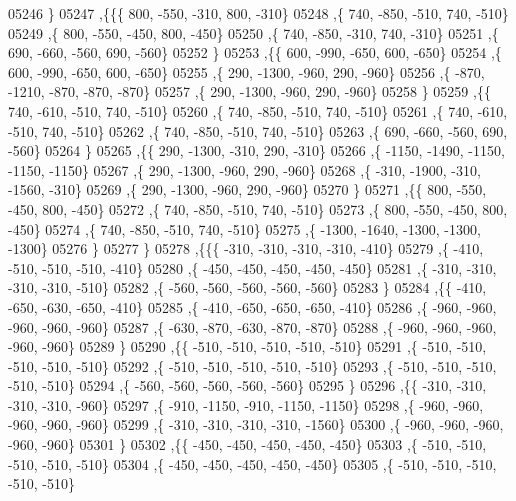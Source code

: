 \begin{DoxyCode}
05246    \}
05247   ,\{\{\{   800,  -550,  -310,   800,  -310\}
05248     ,\{   740,  -850,  -510,   740,  -510\}
05249     ,\{   800,  -550,  -450,   800,  -450\}
05250     ,\{   740,  -850,  -310,   740,  -310\}
05251     ,\{   690,  -660,  -560,   690,  -560\}
05252     \}
05253    ,\{\{   600,  -990,  -650,   600,  -650\}
05254     ,\{   600,  -990,  -650,   600,  -650\}
05255     ,\{   290, -1300,  -960,   290,  -960\}
05256     ,\{  -870, -1210,  -870,  -870,  -870\}
05257     ,\{   290, -1300,  -960,   290,  -960\}
05258     \}
05259    ,\{\{   740,  -610,  -510,   740,  -510\}
05260     ,\{   740,  -850,  -510,   740,  -510\}
05261     ,\{   740,  -610,  -510,   740,  -510\}
05262     ,\{   740,  -850,  -510,   740,  -510\}
05263     ,\{   690,  -660,  -560,   690,  -560\}
05264     \}
05265    ,\{\{   290, -1300,  -310,   290,  -310\}
05266     ,\{ -1150, -1490, -1150, -1150, -1150\}
05267     ,\{   290, -1300,  -960,   290,  -960\}
05268     ,\{  -310, -1900,  -310, -1560,  -310\}
05269     ,\{   290, -1300,  -960,   290,  -960\}
05270     \}
05271    ,\{\{   800,  -550,  -450,   800,  -450\}
05272     ,\{   740,  -850,  -510,   740,  -510\}
05273     ,\{   800,  -550,  -450,   800,  -450\}
05274     ,\{   740,  -850,  -510,   740,  -510\}
05275     ,\{ -1300, -1640, -1300, -1300, -1300\}
05276     \}
05277    \}
05278   ,\{\{\{  -310,  -310,  -310,  -310,  -410\}
05279     ,\{  -410,  -510,  -510,  -510,  -410\}
05280     ,\{  -450,  -450,  -450,  -450,  -450\}
05281     ,\{  -310,  -310,  -310,  -310,  -510\}
05282     ,\{  -560,  -560,  -560,  -560,  -560\}
05283     \}
05284    ,\{\{  -410,  -650,  -630,  -650,  -410\}
05285     ,\{  -410,  -650,  -650,  -650,  -410\}
05286     ,\{  -960,  -960,  -960,  -960,  -960\}
05287     ,\{  -630,  -870,  -630,  -870,  -870\}
05288     ,\{  -960,  -960,  -960,  -960,  -960\}
05289     \}
05290    ,\{\{  -510,  -510,  -510,  -510,  -510\}
05291     ,\{  -510,  -510,  -510,  -510,  -510\}
05292     ,\{  -510,  -510,  -510,  -510,  -510\}
05293     ,\{  -510,  -510,  -510,  -510,  -510\}
05294     ,\{  -560,  -560,  -560,  -560,  -560\}
05295     \}
05296    ,\{\{  -310,  -310,  -310,  -310,  -960\}
05297     ,\{  -910, -1150,  -910, -1150, -1150\}
05298     ,\{  -960,  -960,  -960,  -960,  -960\}
05299     ,\{  -310,  -310,  -310,  -310, -1560\}
05300     ,\{  -960,  -960,  -960,  -960,  -960\}
05301     \}
05302    ,\{\{  -450,  -450,  -450,  -450,  -450\}
05303     ,\{  -510,  -510,  -510,  -510,  -510\}
05304     ,\{  -450,  -450,  -450,  -450,  -450\}
05305     ,\{  -510,  -510,  -510,  -510,  -510\}

\end{DoxyCode}
